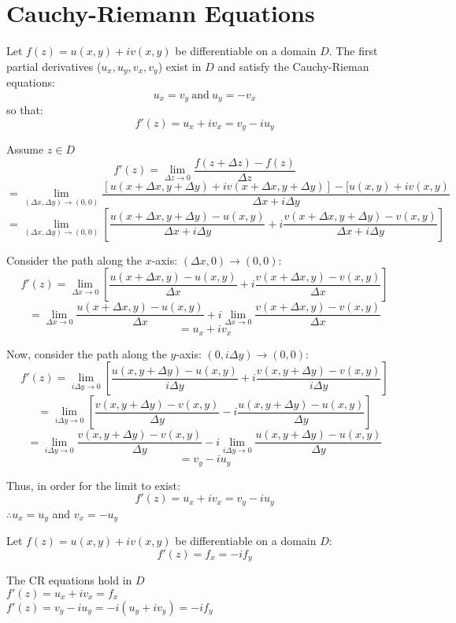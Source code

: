 \documentclass[letterpaper,12pt,fleqn]{article}
\newcommand{\D}{\Delta}
\newcommand{\Dx}{\D x}
\newcommand{\Dy}{\D y}
\newcommand{\Dz}{\D z}
\newcommand{\limDx}{\lim_{\Dx\to 0}}
\newcommand{\limDy}{\lim_{i\Dy\to 0}}
\newcommand{\limDz}{\lim_{\Dz\to 0}}
\newcommand{\limDxy}{\lim_{(\Dx,\Dy)\to (0,0)}}
\begin{document}
\section*{Cauchy-Riemann Equations}

\begin{theorem}
  Let $f(z)=u(x,y)+iv(x,y)$ be differentiable on a domain $D$. The first
  partial derivatives ($u_x,u_y,v_x,v_y$) exist in $D$ and satisfy the
  Cauchy-Rieman equations:
  \[u_x=v_y\ \mbox{and}\ u_y=-v_x\]
  so that:
  \[f'(z)=u_x+iv_x=v_y-iu_y\]
\end{theorem}

\begin{theproof}
  Assume $z\in D$
  \[f'(z)=\limDz{\frac{f(z+\Dz)-f(z)}{\Dz}}\]
  \[=\limDxy{\frac{[u(x+\Dx,y+\Dy)+iv(x+\Dx,y+\Dy)]-
      [u(x,y)+iv(x,y)}{\Dx+i\Dy}}\]
  \[=\limDxy{\left[\frac{u(x+\Dx,y+\Dy)-u(x,y)}{\Dx+i\Dy}+
      i\frac{v(x+\Dx,y+\Dy)-v(x,y)}{\Dx+i\Dy}\right]}\]
  
  Consider the path along the $x$-axis: $(\Dx,0)\to(0,0)$:
  \[f'(z)=\limDx{\left[\frac{u(x+\Dx,y)-u(x,y)}{\Dx}+
      i\frac{v(x+\Dx,y)-v(x,y)}{\Dx}\right]}\]
  \[=\limDx{\frac{u(x+\Dx,y)-u(x,y)}{\Dx}}+
  i\limDx{\frac{v(x+\Dx,y)-v(x,y)}{\Dx}}\]
  \[=u_x+iv_x\]
  
  Now, consider the path along the $y$-axis: $(0,i\Dy)\to(0,0)$:
  \[f'(z)=\limDy{\left[\frac{u(x,y+\Dy)-u(x,y)}{i\Dy}+
      i\frac{v(x,y+\Dy)-v(x,y)}{i\Dy}\right]}\]
  \[=\limDy{\left[\frac{v(x,y+\Dy)-v(x,y)}{\Dy}-
      i\frac{u(x,y+\Dy)-u(x,y)}{\Dy}\right]}\]
  \[=\limDy{\frac{v(x,y+\Dy)-v(x,y)}{\Dy}}-
  i\limDy{\frac{u(x,y+\Dy)-u(x,y)}{\Dy}}\]
  \[=v_y-iu_y\]

  Thus, in order for the limit to exist:
  \[f'(z)=u_x+iv_x=v_y-iu_y\]
  $\therefore u_x=u_y$ and $v_x=-u_y$
\end{theproof}

\begin{corollary}
  Let $f(z)=u(x,y)+iv(x,y)$ be differentiable on a domain $D$:
  \[f'(z)=f_x=-if_y\]
\end{corollary}

\begin{theproof}
  The CR equations hold in $D$ \\
  $f'(z)=u_x+iv_x=f_x$ \\
  $f'(z)=v_y-iu_y=-i(u_y+iv_y)=-if_y$
\end{theproof}
\end{document}
